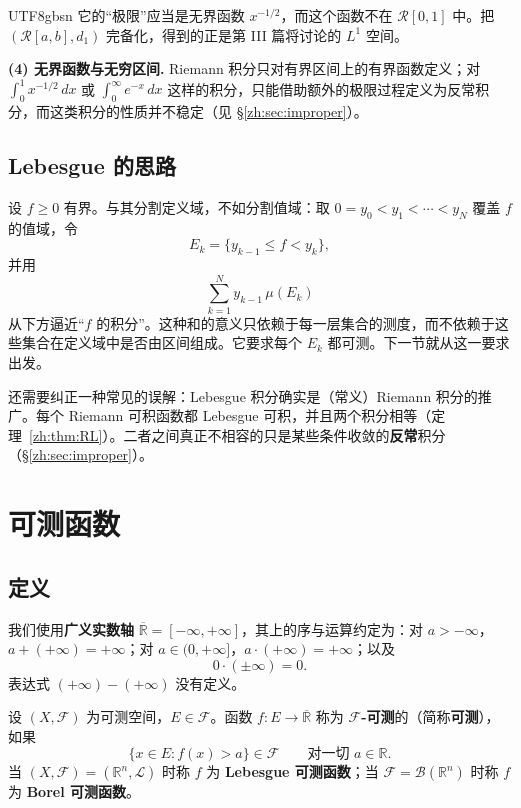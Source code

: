 \documentclass[11pt]{article}
\begin{document}
\begin{CJK*}{UTF8}{gbsn}
它的“极限”应当是无界函数 $x^{-1/2}$，而这个函数不在 $\mathcal{R}[0,1]$ 中。把 $(\mathcal{R}[a,b],d_{1})$ 完备化，得到的正是第 III 篇将讨论的 $L^{1}$ 空间。

\textbf{(4) 无界函数与无穷区间.} Riemann 积分只对有界区间上的有界函数定义；对 $\int_{0}^{1}x^{-1/2}\,dx$ 或 $\int_{0}^{\infty}e^{-x}\,dx$ 这样的积分，只能借助额外的极限过程定义为反常积分，而这类积分的性质并不稳定（见 \S\ref{zh:sec:improper}）。

\subsection{Lebesgue 的思路}

设 $f\geq0$ 有界。与其分割定义域，不如分割值域：取 $0=y_{0}<y_{1}<\cdots<y_{N}$ 覆盖 $f$ 的值域，令
\[
E_{k}=\{y_{k-1}\leq f<y_{k}\},
\]
并用
\[
\sum_{k=1}^{N}y_{k-1}\,\mu(E_{k})
\]
从下方逼近“$f$ 的积分”。这种和的意义只依赖于每一层集合的测度，而不依赖于这些集合在定义域中是否由区间组成。它要求每个 $E_{k}$ 都可测。下一节就从这一要求出发。

还需要纠正一种常见的误解：Lebesgue 积分确实是（常义）Riemann 积分的推广。每个 Riemann 可积函数都 Lebesgue 可积，并且两个积分相等（定理~\ref{zh:thm:RL}）。二者之间真正不相容的只是某些条件收敛的\textbf{反常}积分（\S\ref{zh:sec:improper}）。

\section{可测函数}

\subsection{定义}

我们使用\textbf{广义实数轴} $\overline{\mathbb{R}}=[-\infty,+\infty]$，其上的序与运算约定为：对 $a>-\infty$，$a+(+\infty)=+\infty$；对 $a\in(0,+\infty]$，$a\cdot(+\infty)=+\infty$；以及
\[
0\cdot(\pm\infty)=0.
\]
表达式 $(+\infty)-(+\infty)$ 没有定义。

\begin{definition}[可测函数]
设 $(X,\mathcal{F})$ 为可测空间，$E\in\mathcal{F}$。函数 $f:E\to\overline{\mathbb{R}}$ 称为 \textbf{$\mathcal{F}$-可测}的（简称\textbf{可测}），如果
\[
\{x\in E:f(x)>a\}\in\mathcal{F}\qquad\text{对一切 }a\in\mathbb{R}.
\]
当 $(X,\mathcal{F})=(\mathbb{R}^{n},\mathcal{L})$ 时称 $f$ 为 \textbf{Lebesgue 可测函数}；当 $\mathcal{F}=\mathcal{B}(\mathbb{R}^{n})$ 时称 $f$ 为 \textbf{Borel 可测函数}。
\end{definition}


\end{CJK*}
\end{document}
